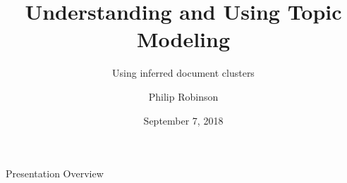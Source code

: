 \documentclass[10pt]{beamer}
\title{Understanding and Using Topic Modeling}
\subtitle{Using inferred document clusters}
\author{Philip Robinson}
\date{September 7, 2018}
\institute{Presented to itds \\ NASA - Jet Propulsion Lab}
\begin{document}
\begin{frame}
  \titlepage

\end{frame}


\begin{frame}{Presentation Overview}
  \tableofcontents

\end{frame}

\end{document}
